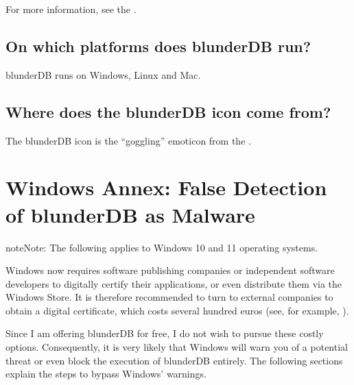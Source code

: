 \documentclass[letterpaper,10pt,english]{sphinxmanual}
\begin{document}
\sphinxAtStartPar
For more information, see the .


\subsection{On which platforms does blunderDB run?}
\label{\detokenize{faq:sur-quelles-plateformes-blunderdb-fonctionne-t-il}}
\sphinxAtStartPar
blunderDB runs on Windows, Linux and Mac.


\subsection{Where does the blunderDB icon come from?}
\label{\detokenize{faq:d-ou-vient-l-icone-de-blunderdb}}
\sphinxAtStartPar
The blunderDB icon is the “goggling” emoticon from the  .

\sphinxstepscope


\section{Windows Annex: False Detection of blunderDB as Malware}
\label{\detokenize{annexe_windows_securite:annexe-windows-detection-abusive-de-blunderdb-comme-logiciel-malveillant}}\label{\detokenize{annexe_windows_securite:annexe-windows-malware}}\label{\detokenize{annexe_windows_securite::doc}}
\begin{sphinxadmonition}{note}{Note:}
\sphinxAtStartPar
The following applies to Windows 10 and 11 operating systems.
\end{sphinxadmonition}

\sphinxAtStartPar
Windows now requires software publishing companies or independent software developers to digitally certify their applications, or even distribute them via the Windows Store. It is therefore recommended to turn to external companies to obtain a digital certificate, which costs several hundred euros (see, for example, ).

\sphinxAtStartPar
Since I am offering blunderDB for free, I do not wish to pursue these costly options. Consequently, it is very likely that Windows will warn you of a potential threat or even block the execution of blunderDB entirely. The following sections explain the steps to bypass Windows’ warnings.
\end{document}
